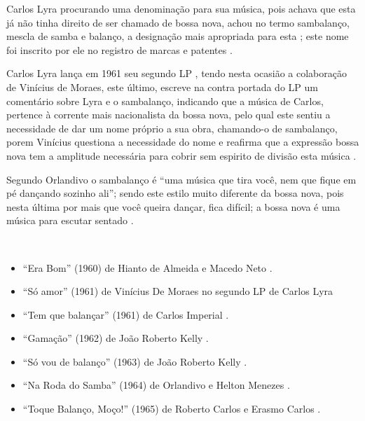 Carlos Lyra procurando uma denominação para sua música, 
pois achava que esta já não tinha direito de ser chamado de bossa nova,
achou no termo sambalanço, mescla de samba e balanço, a designação mais apropriada para esta \cite{castro2011bossa};
este nome foi inscrito por ele no registro de marcas e patentes \cite[pp. 127]{vianna1999bezerra} \cite{castro2011bossa}.


Carlos Lyra lança em 1961  seu segundo LP \cite[pp. 142]{lyrasongbook}  \cite{castro2011bossa}, 
tendo nesta ocasião a colaboração de Vinícius de Moraes,
este último, escreve na contra portada do LP um comentário sobre Lyra e o sambalanço,
indicando que a música de Carlos, pertence à corrente mais nacionalista da bossa nova,
pelo qual este sentiu a necessidade de dar um nome próprio a sua obra, 
chamando-o de sambalanço, 
porem Vinícius questiona a necessidade do nome e reafirma que a expressão 
 bossa nova tem a amplitude necessária para cobrir sem espirito de divisão esta música \cite{castro2011bossa}.

Segundo Orlandivo o sambalanço é ``uma música que tira você, nem que fique em pé dançando sozinho ali'';
sendo este estilo muito diferente da bossa nova, pois nesta última por mais que você queira dançar, fica difícil;
a bossa nova é uma música para escutar sentado \cite{de2017sambalanco}.
\begin{example} ~

\begin{itemize}
\item ``Era Bom'' (1960) de Hianto de Almeida e Macedo Neto  \cite[pp. 123]{de2003tem}.
\item ``Só amor'' (1961) de Vinícius De Moraes no segundo LP de Carlos Lyra \cite[pp. 142]{lyrasongbook}  
\item ``Tem que balançar'' (1961) de Carlos Imperial  \cite{de2017sambalanco}.
\item ``Gamação'' (1962) de João Roberto Kelly \cite[pp. 122]{de2003tem}.
\item ``Só vou de balanço'' (1963) de João Roberto Kelly \cite{de2017sambalanco}.
\item ``Na Roda do Samba'' (1964) de Orlandivo e Helton Menezes \cite{de2017sambalanco} \cite[pp. 122]{de2003tem}.
\item ``Toque Balanço, Moço!'' (1965) de Roberto Carlos e Erasmo Carlos \cite{de2017sambalanco} \cite[pp. 123]{de2003tem}.
\end{itemize}
\end{example}

